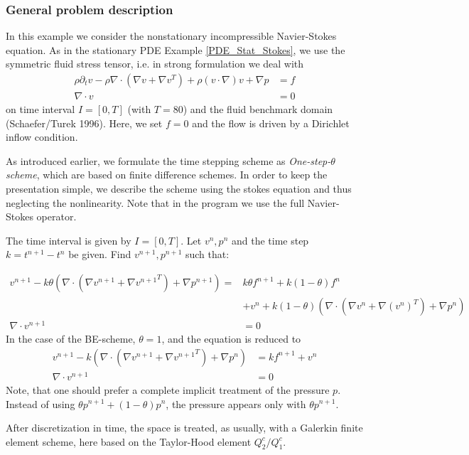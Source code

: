 \subsubsection{General problem description}
In this example we consider the nonstationary incompressible Navier-Stokes equation. As in the stationary PDE Example \ref{PDE_Stat_Stokes},
we use the symmetric fluid stress tensor, i.e. 
in strong formulation we deal with 
\begin{align*}
\rho \partial_t v - \rho \nabla\cdot (\nabla v + \nabla v^{T}) + \rho (v\cdot\nabla)v  +\nabla p &= f \\
\nabla\cdot v &= 0 
\end{align*}
on time interval $I=[0,T]$ (with $T=80$) and the fluid benchmark domain (Schaefer/Turek 1996). 
Here, we set $f=0$ and the flow is driven by a Dirichlet inflow condition.


As introduced earlier, we formulate the time stepping scheme as \textit{One-step-$\theta$ scheme},
which are based on finite difference schemes. In order to keep the presentation simple, we describe the scheme using the stokes equation and thus neglecting the nonlinearity. Note that in the program we use the full Navier-Stokes operator.

The time interval is given by $I=[0,T]$. Let $v^n,p^n$ and the time
step $k=t^{n+1}-t^n$ be given. Find $v^{n+1}, p^{n+1}$ such that:

\begin{align*}
v^{n+1} - k\theta \left(\nabla\cdot (\nabla v^{n+1} + \nabla {v^{n+1}}^T) + \nabla p^{n+1}\right) =&
k\theta f^{n+1} + k(1-\theta)f^{n}\\
&+  v^n + k(1-\theta) \left(\nabla\cdot (\nabla v^n + \nabla (v^n)^{T}) 
+ \nabla p^n\right) \\
\nabla \cdot v^{n+1} &= 0 
\end{align*}
In the case of the BE-scheme, $\theta = 1$, and the equation is reduced to
\begin{align*}
v^{n+1} - k (\nabla\cdot (\nabla v^{n+1} + \nabla {v^{n+1}}^{T}) + \nabla p^n) &=
kf^{n+1} +  v^n  \\
\nabla \cdot v^{n+1} &= 0
\end{align*}
Note, that one should prefer a complete implicit treatment of the
pressure $p$. Instead of using $\theta p^{n+1} + (1-\theta)p^n$, the pressure
appears only with $\theta p^{n+1}$.

After discretization in time, the space is treated, as usually, with 
a Galerkin finite element scheme, here based on the Taylor-Hood element 
$Q_2^c / Q_1^c$.

